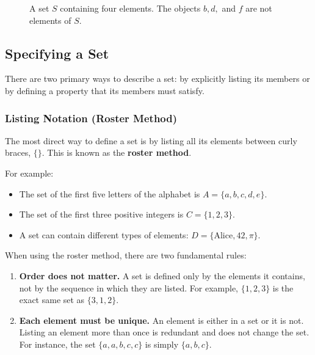 \begin{figure}[htbp]
    \centering
    \caption{A set $S$ containing four elements. The objects $b, d,$ and $f$ are not elements of $S$.}
    \label{fig:set_concept}
\end{figure}

\subsection*{Specifying a Set}
There are two primary ways to describe a set: by explicitly listing its members or by defining a property that its members must satisfy.

\subsubsection*{Listing Notation (Roster Method)}
The most direct way to define a set is by listing all its elements between curly braces, $\{ \}$. This is known as the \textbf{roster method}.

For example:
\begin{itemize}
    \item The set of the first five letters of the alphabet is $A = \{a, b, c, d, e\}$.
    \item The set of the first three positive integers is $C = \{1, 2, 3\}$.
    \item A set can contain different types of elements: $D = \{ \text{Alice}, 42, \pi \}$.
\end{itemize}

When using the roster method, there are two fundamental rules:
\begin{enumerate}
    \item \textbf{Order does not matter.} A set is defined only by the elements it contains, not by the sequence in which they are listed. For example, $\{1, 2, 3\}$ is the exact same set as $\{3, 1, 2\}$.
    \item \textbf{Each element must be unique.} An element is either in a set or it is not. Listing an element more than once is redundant and does not change the set. For instance, the set $\{a, a, b, c, c\}$ is simply $\{a, b, c\}$.
\end{enumerate}


